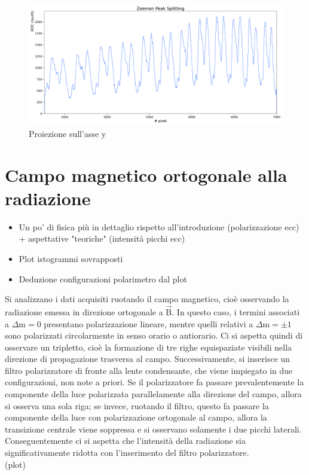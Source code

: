 \documentclass[twocolumn,10pt]{asme2ej}
\begin{document}
\begin{figure}
    \centering
    \includegraphics[width=\textwidth]{../Plots/Bon_Y_proj.png}
    \caption{Proiezione sull'asse y}
    \label{i:spettro2d_Bon_ProjY}
\end{figure}



\section{Campo magnetico ortogonale alla radiazione}

\begin{itemize}
    \item Un po' di fisica più in dettaglio rispetto all'introduzione (polarizzazione ecc) + aspettative "teoriche"
    (intensità picchi ecc)
    \item Plot istogrammi sovrapposti 
    \item Deduzione configurazioni polarimetro dal plot 
\end{itemize}
Si analizzano i dati acquisiti ruotando il campo magnetico, cioè osservando la radiazione emessa 
in direzione ortogonale a $\vec{\text{B}}$. In questo caso, i termini associati a $\Delta \text{m} = 0$ presentano polarizzazione lineare, 
mentre quelli relativi a $\Delta \text{m} = \pm 1$ sono polarizzati circolarmente in senso orario o antiorario. 
Ci si aspetta quindi di osservare un tripletto, cioè la formazione di tre righe equispaziate visibili nella direzione 
di propagazione trasversa al campo. Successivamente, si inserisce un filtro polarizzatore di fronte alla lente condensante, che viene impiegato in due configurazioni, non note a priori. 
Se il polarizzatore fa passare prevalentemente la componente della luce polarizzata parallelamente alla direzione del campo, allora si osserva una sola riga; se invece, ruotando il filtro, questo 
fa passare la componente della luce con polarizzazione ortogonale al campo, allora la transizione centrale viene soppressa e si osservano solamente i due picchi laterali.
Conseguentemente ci si aspetta che l'intensità della radiazione sia significativamente ridotta con l'inserimento del filtro polarizzatore.  
\\ (plot)
\end{document}
